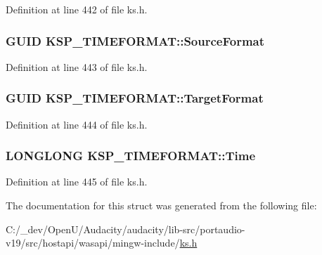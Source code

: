 Definition at line 442 of file ks.\+h.

\subsubsection[{\texorpdfstring{Source\+Format}{SourceFormat}}]{\setlength{\rightskip}{0pt plus 5cm}G\+U\+ID K\+S\+P\+\_\+\+T\+I\+M\+E\+F\+O\+R\+M\+A\+T\+::\+Source\+Format}\hypertarget{struct_k_s_p___t_i_m_e_f_o_r_m_a_t_af7fca0d5afc6d890295e36753e5e386c}{}\label{struct_k_s_p___t_i_m_e_f_o_r_m_a_t_af7fca0d5afc6d890295e36753e5e386c}


Definition at line 443 of file ks.\+h.

\subsubsection[{\texorpdfstring{Target\+Format}{TargetFormat}}]{\setlength{\rightskip}{0pt plus 5cm}G\+U\+ID K\+S\+P\+\_\+\+T\+I\+M\+E\+F\+O\+R\+M\+A\+T\+::\+Target\+Format}\hypertarget{struct_k_s_p___t_i_m_e_f_o_r_m_a_t_a6ec0ce402b19025bbc62013c9403e1b5}{}\label{struct_k_s_p___t_i_m_e_f_o_r_m_a_t_a6ec0ce402b19025bbc62013c9403e1b5}


Definition at line 444 of file ks.\+h.

\subsubsection[{\texorpdfstring{Time}{Time}}]{\setlength{\rightskip}{0pt plus 5cm}L\+O\+N\+G\+L\+O\+NG K\+S\+P\+\_\+\+T\+I\+M\+E\+F\+O\+R\+M\+A\+T\+::\+Time}\hypertarget{struct_k_s_p___t_i_m_e_f_o_r_m_a_t_a189ecd34871a3d0930ceb4a81b2605e0}{}\label{struct_k_s_p___t_i_m_e_f_o_r_m_a_t_a189ecd34871a3d0930ceb4a81b2605e0}


Definition at line 445 of file ks.\+h.



The documentation for this struct was generated from the following file\+:\begin{DoxyCompactItemize}
\item 
C\+:/\+\_\+dev/\+Open\+U/\+Audacity/audacity/lib-\/src/portaudio-\/v19/src/hostapi/wasapi/mingw-\/include/\hyperlink{ks_8h}{ks.\+h}\end{DoxyCompactItemize}
